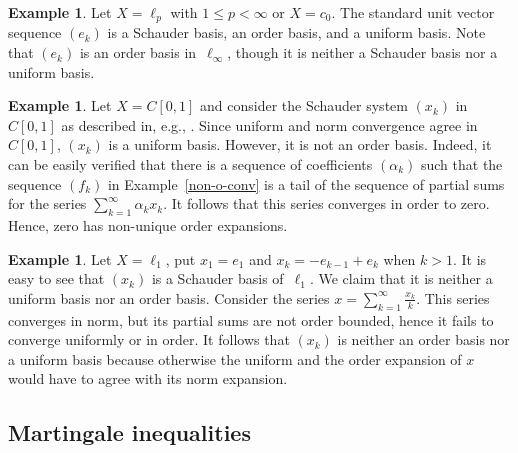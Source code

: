 \documentclass[12pt]{amsart}
\theoremstyle{plain}
\theoremstyle{definition}
\newtheorem{example}[theorem]{Example}
\newcommand{\s}{\sum_{k=1}^\infty}
\renewcommand{\le}{\leqslant}
\begin{document}
\begin{example}
  Let $X=\ell_p$ with $1\le p<\infty$ or $X=c_0$. The standard unit
  vector sequence $(e_k)$ is a Schauder basis, an order basis, and a
  uniform basis. Note that $(e_k)$ is an order basis in~$\ell_\infty$,
  though it is neither a Schauder basis nor a uniform basis.
\end{example}

\begin{example}\label{C01-Sch}
  Let $X=C[0,1]$ and consider the Schauder system $(x_k)$ in $C[0,1]$
  as described in, e.g., \cite[p.~3]{Lindenstrauss:77}.  Since uniform
  and norm convergence agree in $C[0,1]$, $(x_k)$ is a uniform
  basis. However, it is not an order basis. Indeed, it can be easily
  verified that there is a sequence of coefficients $(\alpha_k)$ such
  that the sequence $(f_k)$ in Example~\ref{non-o-conv} is a tail of
  the sequence of partial sums for the series $\s\alpha_kx_k$. It
  follows that this series converges in order to zero. Hence, zero has
  non-unique order expansions.
\end{example}

\begin{example}\label{dual-summ}
  Let $X=\ell_1$, put $x_1=e_1$ and $x_k=-e_{k-1}+e_k$ when $k>1$. It
  is easy to see that $(x_k)$ is a Schauder basis of~$\ell_1$. We
  claim that it is neither a uniform basis nor an order basis.
  Consider the series $x=\sum_{k=1}^\infty\frac{x_k}{k}$. This series
  converges in norm, but its partial sums are not order bounded, hence
  it fails to converge uniformly or in order. It follows that $(x_k)$
  is neither an order basis nor a uniform basis because otherwise the
  uniform and the order expansion of $x$ would have to agree with its
  norm expansion.
\end{example}



\subsection*{Martingale inequalities}
\end{document}
